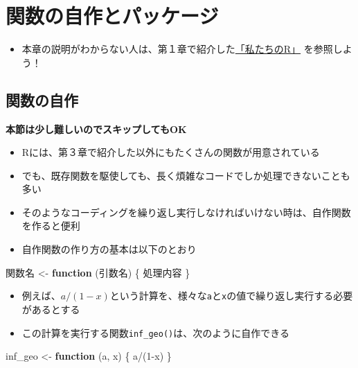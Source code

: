 \documentclass[
]{book}
\newenvironment{Shaded}{\begin{snugshade}}{\end{snugshade}}
\newcommand{\ControlFlowTok}[1]{\textcolor[rgb]{0.13,0.29,0.53}{\textbf{#1}}}
\newcommand{\DecValTok}[1]{\textcolor[rgb]{0.00,0.00,0.81}{#1}}
\newcommand{\NormalTok}[1]{#1}
\newcommand{\OtherTok}[1]{\textcolor[rgb]{0.56,0.35,0.01}{#1}}
\newcommand{\SpecialCharTok}[1]{\textcolor[rgb]{0.00,0.00,0.00}{#1}}
\providecommand{\tightlist}{%
  \setlength{\itemsep}{0pt}\setlength{\parskip}{0pt}}
\begin{document}
\hypertarget{ux95a2ux6570ux306eux81eaux4f5cux3068ux30d1ux30c3ux30b1ux30fcux30b8}{%
\chapter{関数の自作とパッケージ}\label{ux95a2ux6570ux306eux81eaux4f5cux3068ux30d1ux30c3ux30b1ux30fcux30b8}}

\begin{itemize}
\tightlist
\item
  本章の説明がわからない人は、第１章で紹介した\href{https://www.jaysong.net/RBook/datahandling1.html}{「私たちのR」} を参照しよう！
\end{itemize}

\hypertarget{ux95a2ux6570ux306eux81eaux4f5c}{%
\section{関数の自作}\label{ux95a2ux6570ux306eux81eaux4f5c}}

\textbf{本節は少し難しいのでスキップしてもOK }

\begin{itemize}
\tightlist
\item
  Rには、第３章で紹介した以外にもたくさんの関数が用意されている
\item
  でも、既存関数を駆使しても、長く煩雑なコードでしか処理できないことも多い
\item
  そのようなコーディングを繰り返し実行しなければいけない時は、自作関数を作ると便利
\item
  自作関数の作り方の基本は以下のとおり
\end{itemize}

\begin{Shaded}
\begin{Highlighting}[]
\NormalTok{関数名 }\OtherTok{\textless{}{-}} \ControlFlowTok{function}\NormalTok{ (引数名) \{}
\NormalTok{  処理内容}
\NormalTok{\}}
\end{Highlighting}
\end{Shaded}

\begin{itemize}
\tightlist
\item
  例えば、\(a/(1-x)\)という計算を、様々な\texttt{a}と\texttt{x}の値で繰り返し実行する必要があるとする
\item
  この計算を実行する関数\texttt{inf\_geo()}は、次のように自作できる
\end{itemize}

\begin{Shaded}
\begin{Highlighting}[]
\NormalTok{inf\_geo }\OtherTok{\textless{}{-}} \ControlFlowTok{function}\NormalTok{ (a, x) \{}
\NormalTok{  a}\SpecialCharTok{/}\NormalTok{(}\DecValTok{1}\SpecialCharTok{{-}}\NormalTok{x)}
\NormalTok{\}}
\end{Highlighting}
\end{Shaded}
\end{document}
